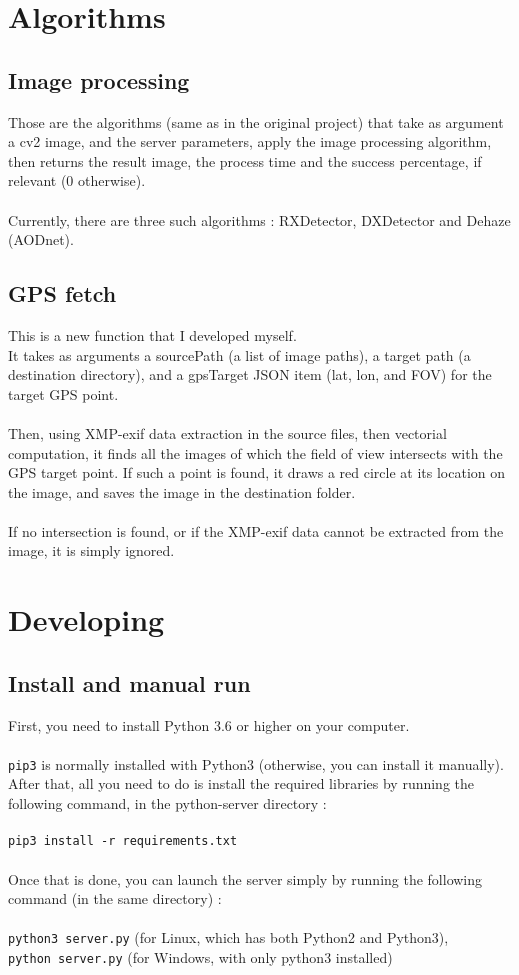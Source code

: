 \documentclass[12pt,a4paper]{article}
\begin{document}
\section{Algorithms}

\subsection{Image processing}

Those are the algorithms (same as in the original project) that take as argument a cv2 image, and the server parameters, apply the image processing algorithm, then returns the result image, the process time and the success percentage, if relevant (0 otherwise).\\
~\\
Currently, there are three such algorithms : RXDetector, DXDetector and Dehaze (AODnet).

\subsection{GPS fetch}
This is a new function that I developed myself.\\
It takes as arguments a sourcePath (a list of image paths), a target path (a destination directory), and a gpsTarget JSON item (lat, lon, and FOV) for the target GPS point.\\
~\\
Then, using XMP-exif data extraction in the source files, then vectorial computation, it finds all the images of which the field of view intersects with the GPS target point. If such a point is found, it draws a red circle at its location on the image, and saves the image in the destination folder.\\
~\\
If no intersection is found, or if the XMP-exif data cannot be extracted from the image, it is simply ignored.

\section{Developing}
\subsection{Install and manual run}
First, you need to install Python 3.6 or higher on your computer.\\
~\\
\texttt{pip3} is normally installed with Python3 (otherwise, you can install it manually). After that, all you need to do is install the required libraries by running the following command, in the python-server directory :\\
~\\
\texttt{pip3 install -r requirements.txt}\\
~\\
Once that is done, you can launch the server simply by running the following command (in the same directory) :\\
~\\
\texttt{python3 server.py} (for Linux, which has both Python2 and Python3),\\
\texttt{python server.py} (for Windows, with only python3 installed)
\end{document}
